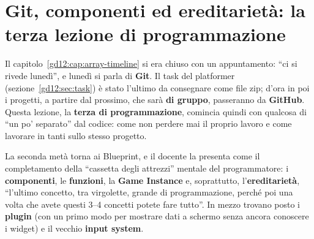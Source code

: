\chapter[Git, componenti ed ereditarietà]{Git, componenti ed ereditarietà: la
terza lezione di programmazione}
\label{gd13:cap:git-componenti}

Il capitolo~\ref{gd12:cap:array-timeline} si era chiuso con un appuntamento:
``ci si rivede lunedì'', e lunedì si parla di \textbf{Git}. Il task del
platformer (sezione~\ref{gd12:sec:task}) è stato l'ultimo da consegnare come
file zip; d'ora in poi i progetti, a partire dal prossimo, che sarà
\textbf{di gruppo}, passeranno da \textbf{GitHub}. Questa lezione, la
\textbf{terza di programmazione}, comincia quindi con qualcosa di ``un po'
separato'' dal codice: come non perdere mai il proprio lavoro e come lavorare
in tanti sullo stesso progetto.

La seconda metà torna ai Blueprint, e il docente la presenta come il
completamento della ``cassetta degli attrezzi'' mentale del programmatore: i
\textbf{componenti}, le \textbf{funzioni}, la \textbf{Game Instance} e,
soprattutto, l'\textbf{ereditarietà}, ``l'ultimo concetto, tra virgolette,
grande di programmazione, perché poi una volta che avete questi 3--4 concetti
potete fare tutto''. In mezzo trovano posto i \textbf{plugin} (con un primo modo
per mostrare dati a schermo senza ancora conoscere i widget) e il vecchio
\textbf{input system}.

